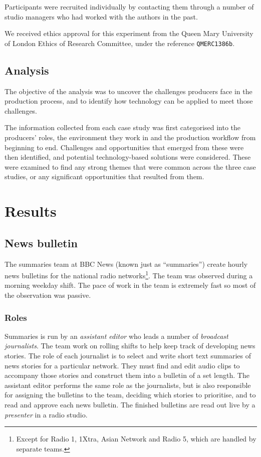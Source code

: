 Participants were recruited individually by contacting them through a number of studio managers who had worked with the
authors in the past. 

We received ethics approval for this experiment from the Queen Mary University of London Ethics of Research Committee,
under the reference \texttt{QMERC1386b}.

\subsection{Analysis}
The objective of the analysis was to uncover the challenges producers face in the production process, and to identify
how technology can be applied to meet those challenges.

The information collected from each case study was first categorised into the producers' roles, the environment they
work in and the production workflow from beginning to end. Challenges and opportunities that emerged from these were
then identified, and potential technology-based solutions were considered.  These were examined to find any strong
themes that were common across the three case studies, or any significant opportunities that resulted from them.

\section{Results}

\subsection{News bulletin}\label{sec:news}
The summaries team at BBC News (known just as ``summaries'') create hourly news bulletins for the national radio
networks\footnote{Except for Radio 1, 1Xtra, Asian Network and Radio 5, which are handled by separate teams.}. The team
was observed during a morning weekday shift. The pace of work in the team is extremely fast so most of the observation
was passive.

\subsubsection{Roles}\label{sec:news-roles}
Summaries is run by an \textit{assistant editor} who leads a number of \textit{broadcast journalists}. The team work on
rolling shifts to help keep track of developing news stories. The role of each journalist is to select and write short
text summaries of news stories for a particular network. They must find and edit audio clips to accompany those stories
and construct them into a bulletin of a set length.  The assistant editor performs the same role as the journalists,
but is also responsible for assigning the bulletins to the team, deciding which stories to prioritise, and to read and
approve each news bulletin. The finished bulletins are read out live by a \textit{presenter} in a radio studio.

